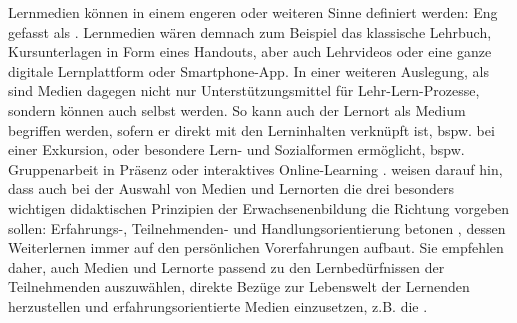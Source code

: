 \documentclass[
  twoside,
  parskip=half-,
  paper=176mm:246mm,
  BCOR=14mm,
  DIV=14,
]{scrreprt}
\begin{document}
Lernmedien können in einem engeren oder weiteren Sinne definiert werden: Eng gefasst als . Lernmedien wären demnach zum Beispiel das klassische Lehrbuch, Kursunterlagen in Form eines Handouts, aber auch Lehrvideos oder eine ganze digitale Lernplattform oder Smartphone-App. In einer weiteren Auslegung, als  sind Medien dagegen nicht nur Unterstützungsmittel für Lehr-Lern-Prozesse, sondern können auch selbst  werden. So kann auch der Lernort als Medium begriffen werden, sofern er direkt mit den Lerninhalten verknüpft ist, bspw. bei einer Exkursion, oder besondere Lern- und Sozialformen ermöglicht, bspw. Gruppenarbeit in Präsenz oder interaktives Online-Learning \autocite[vgl.][102]{schlutz}. \citeauthor{reich-claassen} weisen darauf hin, dass auch bei der Auswahl von Medien und Lernorten die drei besonders wichtigen didaktischen Prinzipien der Erwachsenenbildung die Richtung vorgeben sollen: Erfahrungs-, Teilnehmenden- und Handlungsorientierung betonen , dessen Weiterlernen immer auf den persönlichen Vorerfahrungen aufbaut. Sie empfehlen daher, auch Medien und Lernorte passend zu den Lernbedürfnissen der Teilnehmenden auszuwählen, direkte Bezüge zur Lebenswelt der Lernenden herzustellen und erfahrungsorientierte Medien einzusetzen, z.B. die .
\end{document}
